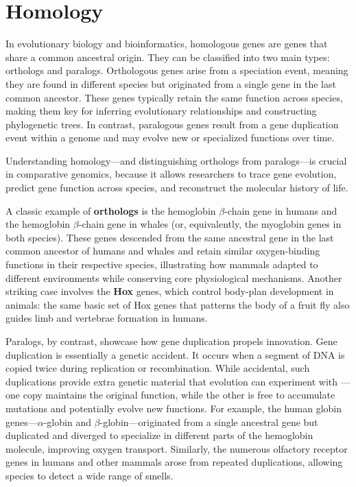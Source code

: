 \section{Homology}

In evolutionary biology 
and bioinformatics, homologous genes are genes that share a common ancestral origin. They can be classified into two main types: orthologs and paralogs. Orthologous genes arise from a speciation event, meaning they are found in different species but originated from a single gene in the last common ancestor. These genes typically retain the same function across species, making them key for inferring evolutionary relationships and constructing phylogenetic trees. In contrast, paralogous genes result from a gene duplication event within a genome and may evolve new or specialized functions over time. 

Understanding homology—and distinguishing orthologs from paralogs—is crucial in comparative genomics, because it allows researchers to trace gene evolution, predict gene function across species, and reconstruct the molecular history of life.

A classic example of \textbf{orthologs} is the hemoglobin $\beta$-chain gene in humans and the hemoglobin $\beta$-chain gene in whales (or, equivalently, the myoglobin genes in both species). These genes descended from the same ancestral gene in the last common ancestor of humans and whales and retain similar oxygen-binding functions in their respective species, illustrating how mammals adapted to different environments while conserving core physiological mechanisms. Another striking case involves the \textbf{Hox} genes, which control body-plan development in animals: the same basic set of Hox genes that patterns the body of a fruit fly also guides limb and vertebrae formation in humans.

Paralogs, by contrast, showcase how gene duplication propels innovation. Gene duplication is essentially a genetic accident. It occurs when a segment of DNA is copied twice during replication or recombination. While accidental, such duplications provide extra genetic material that evolution can experiment with — one copy maintains the original function, while the other is free to accumulate mutations and potentially evolve new functions. For example, the human globin genes—$\alpha$-globin and $\beta$-globin—originated from a single ancestral gene but duplicated and diverged to specialize in different parts of the hemoglobin molecule, improving oxygen transport. Similarly, the numerous olfactory receptor genes in humans and other mammals arose from repeated duplications, allowing species to detect a wide range of smells.

